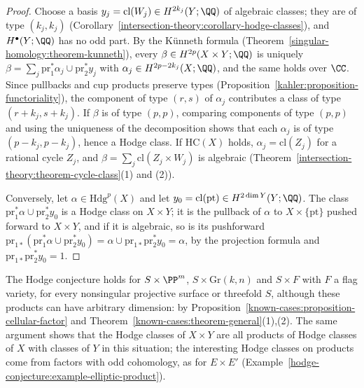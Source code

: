 \begin{proof}
Choose a basis $y_j = \mathrm{cl}(W_j) \in H^{2k_j}(Y; \QQ)$ of algebraic classes; they are of type $(k_j, k_j)$ (Corollary~\ref{intersection-theory:corollary-hodge-classes}), and $H^\bullet(Y; \QQ)$ has no odd part. By the
K\"unneth formula (Theorem~\ref{singular-homology:theorem-kunneth}), every $\beta \in H^{2p}(X \times Y; \QQ)$ is uniquely $\beta = \sum_j\mathrm{pr}_1^*\alpha_j \cup \mathrm{pr}_2^*y_j$ with
$\alpha_j \in H^{2p-2k_j}(X; \QQ)$, and the same holds over $\CC$. Since pullbacks and cup products preserve types (Proposition~\ref{kahler:proposition-functoriality}), the component of type $(r, s)$ of
$\alpha_j$ contributes a class of type $(r + k_j, s + k_j)$. If $\beta$ is of type $(p, p)$, comparing components of type $(p, p)$ and using the uniqueness of the decomposition shows that each $\alpha_j$ is of type
$(p - k_j, p - k_j)$, hence a Hodge class. If $\mathrm{HC}(X)$ holds, $\alpha_j = \mathrm{cl}(Z_j)$ for a rational cycle $Z_j$, and $\beta = \sum_j\mathrm{cl}(Z_j \times W_j)$ is algebraic
(Theorem~\ref{intersection-theory:theorem-cycle-class}(1) and (2)).

Conversely, let $\alpha \in \mathrm{Hdg}^p(X)$ and let $y_0 = \mathrm{cl}(\mathrm{pt}) \in H^{2\dim Y}(Y; \QQ)$. The class $\mathrm{pr}_1^*\alpha \cup \mathrm{pr}_2^*y_0$ is a Hodge class on $X \times Y$; it is the pullback of $\alpha$ to $X \times \{\mathrm{pt}\}$
pushed forward to $X \times Y$, and if it is algebraic, so is its pushforward $\mathrm{pr}_{1*}(\mathrm{pr}_1^*\alpha \cup \mathrm{pr}_2^*y_0) = \alpha \cup \mathrm{pr}_{1*}\mathrm{pr}_2^*y_0 = \alpha$, by the projection formula and
$\mathrm{pr}_{1*}\mathrm{pr}_2^*y_0 = 1$.
\end{proof}

\begin{example}\label{known-cases:example-cellular-factor}
The Hodge conjecture holds for $S \times \PP^m$, $S \times \mathrm{Gr}(k, n)$ and $S \times F$ with $F$ a flag variety, for every nonsingular projective surface or threefold $S$, although these products can have
arbitrary dimension: by Proposition~\ref{known-cases:proposition-cellular-factor} and Theorem~\ref{known-cases:theorem-general}(1),(2). The same argument shows that the Hodge classes of $X \times Y$ are all products of Hodge
classes of $X$ with classes of $Y$ in this situation; the interesting Hodge classes on products come from factors with odd cohomology, as for $E \times E'$
(Example~\ref{hodge-conjecture:example-elliptic-product}).
\end{example}

